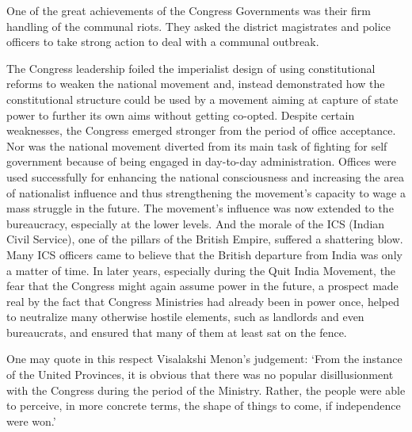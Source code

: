 \begin{multicols}{2}
One of the great achievements of the Congress Governments was their firm handling of the communal riots. They asked the district magistrates and police officers to take strong action to deal with a communal outbreak. 

The Congress leadership foiled the imperialist design of using constitutional reforms to weaken the national movement and, instead demonstrated how the constitutional structure could be used by a movement aiming at capture of state power to further its own aims without getting co-opted. Despite certain weaknesses, the Congress emerged stronger from the period of office acceptance. Nor was the national movement diverted from its main task of fighting for self government because of being engaged in day-to-day administration. Offices were used successfully for enhancing the national consciousness and increasing the area of nationalist influence and thus strengthening the movement's capacity to wage a mass struggle in the future. The movement's influence was now extended to the bureaucracy, especially at the lower levels. And the morale of the ICS (Indian Civil Service), one of the pillars of the British Empire, suffered a shattering blow. Many ICS officers came to believe that the British departure from India was only a matter of time. In later years, especially during the Quit India Movement, the fear that the Congress might again assume power in the future, a prospect made real by the fact that Congress Ministries had already been in power once, helped to neutralize many otherwise hostile elements, such as landlords and even bureaucrats, and ensured that many of them at least sat on the fence. 

One may quote in this respect Visalakshi Menon's judgement: `From the instance of the United Provinces, it is obvious that there was no popular disillusionment with the Congress during the period of the Ministry. Rather, the people were able to perceive, in more concrete terms, the shape of things to come, if independence were won.' 


\end{multicols}
